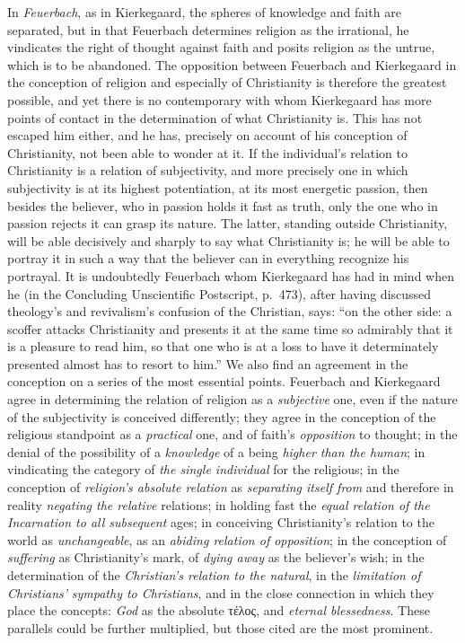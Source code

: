 \documentclass[12pt,a4paper]{book}
\begin{document}
In \emph{Feuerbach}, as in Kierkegaard, the spheres of knowledge and faith are
separated, but in that Feuerbach determines religion as the irrational,
he vindicates the right of thought against faith and posits religion as
the untrue, which is to be abandoned. The opposition between Feuerbach
and Kierkegaard in the conception of religion and especially of
Christianity is therefore the greatest possible, and yet there is no
contemporary with whom Kierkegaard has more points of contact in the
determination of what Christianity is. This has not escaped him either,
and he has, precisely on account of his conception of Christianity, not
been able to wonder at it. If the individual's relation to Christianity
is a relation of subjectivity, and more precisely one in which
subjectivity is at its highest potentiation, at its most energetic
passion, then besides the believer, who in passion holds it fast as
truth, only the one who in passion rejects it can grasp its nature. The
latter, standing outside Christianity, will be able decisively and
sharply to say what Christianity is; he will be able to portray it in
such a way that the believer can in everything recognize his portrayal.
It is undoubtedly Feuerbach whom Kierkegaard has had in mind when he (in
the Concluding Unscientific Postscript, p.\ 473), after having
discussed theology's and revivalism's confusion of the Christian, says:
``on the other side: a scoffer attacks Christianity and presents it at
the same time so admirably that it is a pleasure to read him, so that
one who is at a loss to have it determinately presented almost has to
resort to him.'' We also find an agreement in the conception on a series
of the most essential points. Feuerbach and Kierkegaard agree in
determining the relation of religion as a \emph{subjective} one, even if the
nature of the subjectivity is conceived differently; they agree in the
conception of the religious standpoint as a \emph{practical} one, and of
faith's \emph{opposition} to thought; in the denial of the possibility of a
\emph{knowledge} of a being \emph{higher than the human}; in vindicating the category
of \emph{the single individual} for the religious; in the conception of
\emph{religion's absolute relation} as \emph{separating itself from} and therefore in
reality \emph{negating the relative} relations; in holding fast the \emph{equal
relation of the Incarnation to all subsequent} ages; in conceiving
Christianity's relation to the world as \emph{unchangeable}, as an \emph{abiding
relation of opposition}; in the conception of \emph{suffering} as Christianity's
mark, of \emph{dying away} as the believer's wish; in the determination of the
\emph{Christian's relation to the natural}, in the \emph{limitation of Christians'}
\emph{sympathy to Christians}, and in the close connection in which they place
the concepts: \emph{God} as the absolute τέλος, and \emph{eternal
blessedness}. These parallels could be further multiplied, but those
cited are the most prominent.
\end{document}
